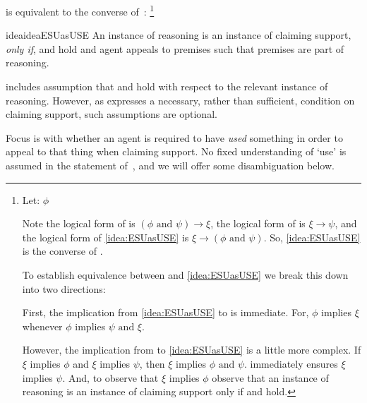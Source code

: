 \begin{note}
  \ESU{} is equivalent to the converse of~\USE{}:\nolinebreak
  \footnote{
    Let:
    \(\phi\) 


    Note the logical form of \USE{} is \((\phi \text{ and } \psi) \rightarrow \xi\), the logical form of \ESU{} is \(\xi \rightarrow \psi\), and the logical form of \autoref{idea:ESUasUSE} is \(\xi \rightarrow (\phi \text{ and } \psi)\).
    So, \autoref{idea:ESUasUSE} is the converse of \USE{}.

    To establish equivalence between \ESU{} and \autoref{idea:ESUasUSE} we break this down into two directions:

    First, the implication from \autoref{idea:ESUasUSE} to \ESU{} is immediate.
    For, \(\phi\) implies \(\xi\) whenever \(\phi\) implies \(\psi \text{ and } \xi\).

    However, the implication from \ESU{} to \autoref{idea:ESUasUSE} is a little more complex.
    If \(\xi\) implies \(\phi\) and \(\xi\) implies \(\psi\), then \(\xi\) implies \(\phi \text{ and } \psi\).
    \ESU{} immediately ensures \(\xi\) implies \(\psi\).
    And, to observe that \(\xi\) implies \(\phi\) observe that an instance of reasoning is an instance of claiming support only if \ideaCSA{} and \ideaCSB{} hold.
  }

  \begin{restatable}[]{idea}{ideaESUasUSE}
    \label{idea:ESUasUSE}
    An instance of reasoning is an instance of claiming support, \emph{only if}, \ideaCSA{} and \ideaCSB{} hold and agent appeals to premises such that premises are part of reasoning.
  \end{restatable}

\end{note}

\begin{note}
  \USE{} includes assumption that \ideaCSA{} and \ideaCSB{} hold with respect to the relevant instance of reasoning.
  However, as \ESU{} expresses a necessary, rather than sufficient, condition on claiming support, such assumptions are optional.
\end{note}

\begin{note}
  Focus is with whether an agent is required to have \emph{used} something in order to appeal to that thing when claiming support.
  No fixed understanding of `use' is assumed in the statement of~\ESU{}, and we will offer some disambiguation below.
\end{note}

